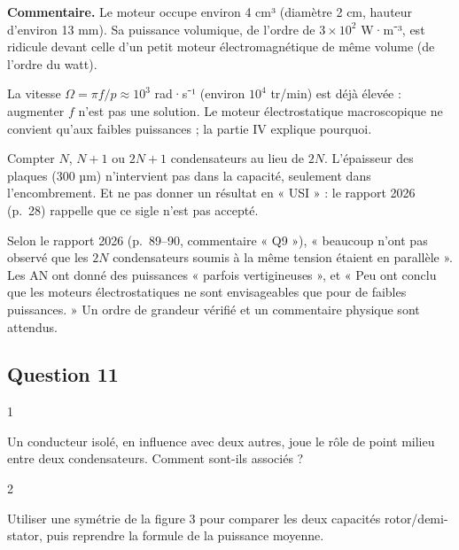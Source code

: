 \documentclass[11pt,a4paper]{article}
\begin{document}
\textbf{Commentaire.} Le moteur occupe environ 4 cm³ (diamètre 2 cm, hauteur d'environ 13 mm). Sa puissance volumique, de l'ordre de \(3\times10^{2}\) W·m⁻³, est ridicule devant celle d'un petit moteur électromagnétique de même volume (de l'ordre du watt).

La vitesse \(\Omega=\pi f/p\approx10^{3}\) rad·s⁻¹ (environ \(10^{4}\) tr/min) est déjà élevée : augmenter \(f\) n'est pas une solution. Le moteur électrostatique macroscopique ne convient qu'aux faibles puissances ; la partie IV explique pourquoi.

\begin{piege}

Compter \(N\), \(N+1\) ou \(2N+1\) condensateurs au lieu de \(2N\). L'épaisseur des plaques (300 µm) n'intervient pas dans la capacité, seulement dans l'encombrement. Et ne pas donner un résultat en « USI » : le rapport 2026 (p.~28) rappelle que ce sigle n'est pas accepté.

\end{piege}

\begin{jury}

Selon le rapport 2026 (p.~89--90, commentaire « Q9 »), « beaucoup n'ont pas observé que les \(2N\) condensateurs soumis à la même tension étaient en parallèle ». Les AN ont donné des puissances « parfois vertigineuses », et « Peu ont conclu que les moteurs électrostatiques ne sont envisageables que pour de faibles puissances. » Un ordre de grandeur vérifié et un commentaire physique sont attendus.

\end{jury}

\hypertarget{question-11}{%
\subsection{Question 11}\label{question-11}}

\begin{indication}{1}

Un conducteur isolé, en influence avec deux autres, joue le rôle de point milieu entre deux condensateurs. Comment sont-ils associés ?

\end{indication}

\begin{indication}{2}

Utiliser une symétrie de la figure 3 pour comparer les deux capacités rotor/demi-stator, puis reprendre la formule de la puissance moyenne.

\end{indication}
\end{document}
